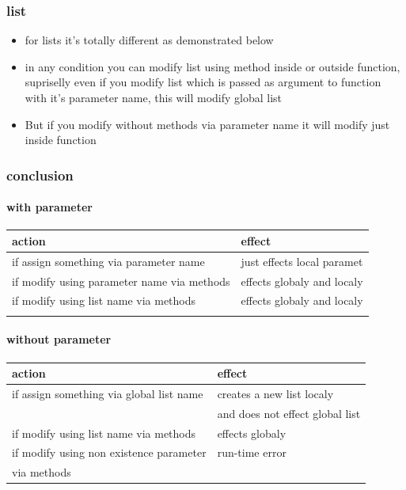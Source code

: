 \documentclass[11pt]{article}
\begin{document}
\subsubsection{list}
\label{sec:org1df7a9b}
\begin{itemize}
\item for lists it's totally different as demonstrated below
\item in any condition you can modify list using method inside or outside
function, supriselly even if you modify list which is passed as
argument to function with it's parameter name, this will modify
global list
\item But if you modify without methods via parameter name it will modify
just inside function
\end{itemize}

\subsubsection{conclusion}
\label{sec:orgb99bf0f}

\paragraph{with parameter}
\label{sec:org362a177}
\begin{center}
\begin{tabular}{ll}
action & effect\\
\hline
if assign something via parameter name & just effects local paramet\\
\hline
if modify using parameter name via methods & effects globaly and localy\\
\hline
if modify using list name via methods & effects globaly and localy\\
\hline
 & \\
\end{tabular}
\end{center}

\paragraph{without parameter}
\label{sec:org80cdaad}
\begin{center}
\begin{tabular}{ll}
action & effect\\
\hline
if assign something via global list name & creates a new list localy\\
 & and does not effect global list\\
\hline
if modify using list name via methods & effects globaly\\
\hline
if modify using non existence parameter & run-time error\\
via methods & \\
\end{tabular}
\end{center}
\end{document}
